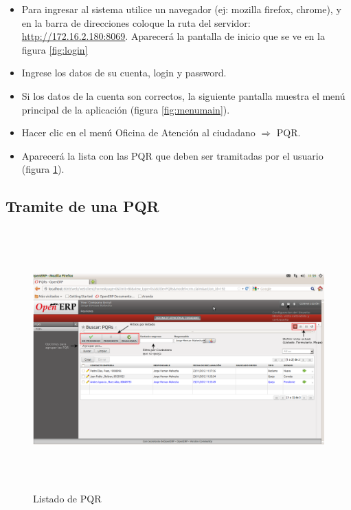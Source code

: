 \begin{itemize}
 \item Para ingresar al sistema utilice un navegador (ej: mozilla firefox, chrome), y en la barra de direcciones coloque la ruta del servidor: \underline{http://172.16.2.180:8069}. Aparecerá la pantalla
 de inicio que se ve en la figura \ref{fig:login}
 \item Ingrese los datos de su cuenta, login y password.
 \item Si los datos de la cuenta son correctos, la siguiente pantalla muestra el menú principal de la aplicación (figura \ref{fig:menumain}).
 \item Hacer clic en el menú Oficina de Atención al ciudadano $\Rightarrow$ PQR.
 \item Aparecerá la lista con las PQR que deben ser tramitadas por el usuario (figura \ref{fig:menulista}).
\end{itemize}


\subsection {Tramite de una PQR}

\begin{figure}[h]
 \centering
 \includegraphics[width=17cm,height=10cm]{./Imagenes/menulista.png}
 \caption{Listado de PQR}
 \label{fig:menulista}
\end{figure}


